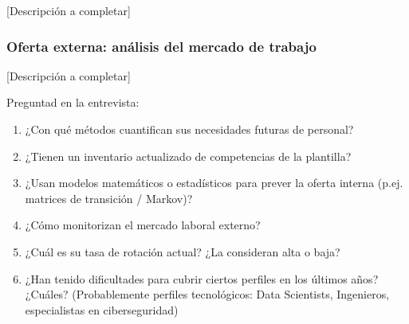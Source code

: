 
[Descripción a completar]

\subsubsection{Oferta externa: análisis del mercado de trabajo}


[Descripción a completar]

\begin{notaequipo}
  Preguntad en la entrevista:
  \begin{enumerate}
    \item ¿Con qué métodos cuantifican sus necesidades futuras de personal?
    \item ¿Tienen un inventario actualizado de competencias de la plantilla?
    \item ¿Usan modelos matemáticos o estadísticos para prever la oferta interna
          (p.ej. matrices de transición / Markov)?
    \item ¿Cómo monitorizan el mercado laboral externo?
    \item ¿Cuál es su tasa de rotación actual? ¿La consideran alta o baja?
    \item ¿Han tenido dificultades para cubrir ciertos perfiles en los últimos años?
          ¿Cuáles? (Probablemente perfiles tecnológicos: Data Scientists, Ingenieros,
          especialistas en ciberseguridad)
  \end{enumerate}
\end{notaequipo}
